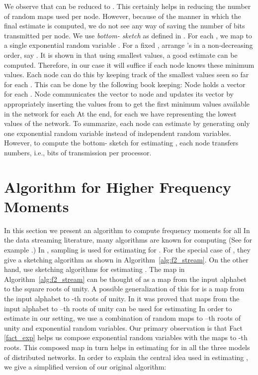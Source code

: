 \documentclass[10pt,twosided,a4paper,draft,onecolumn]{article}
\begin{document}
We observe that  can be reduced to . This certainly helps in
reducing the number of random maps used per node. However, because of
the manner in which the final estimate is computed, we do not see any
way of saving the number of bits transmitted per node. We use
\emph{bottom- sketch} as defined in \cite{Cohen07}. For each , we map  to a single exponential random
variable . For a fixed , arrange 's in a
non-decreasing order, say . It is shown in \cite{Cohen07} that using  smallest
values, a good estimate can be computed.  Therefore, in our case it
will suffice if each node knows these  minimum values.  Each node
can do this by keeping track of the  smallest values seen so far
for each . This can be done by the following book keeping: Node 
holds a vector  for each
. Node  communicates the vector  to node
 and updates its vector by appropriately inserting the values from
 to get the first  minimum values available in the network
for each  At the end, for each  we have  representing the  lowest values of the
network. To summarize, each node can estimate  by generating
only one exponential random variable instead of  independent
random variables. However, to compute the bottom- sketch for
estimating , each node transfers  numbers, i.e.,
 bits of transmission per processor.

\section{Algorithm for Higher Frequency Moments}
\label{sec:Fk}

In this section we present an algorithm to compute frequency moments
 for all  In the data streaming literature, many
algorithms are known for computing  (See for example
\cite{Alon96,Coppersmith04,Ganguly04}.) In \cite{Alon96}, sampling is
used for estimating  for . For the special case of
, they give a sketching algorithm as shown in
Algorithm~\ref{alg:f2_stream}. On the other hand,
\cite{Coppersmith04,Ganguly04} use sketching algorithms for estimating
. The map  in Algorithm~\ref{alg:f2_stream} can be thought
of as a map from the input alphabet to the square roots of unity. A
possible generalization of this for  is a map from the input
alphabet to -th roots of unity. In \cite{Ganguly04} it was proved
that maps from the input alphabet to --th roots of unity can be
used for estimating  In order to estimate  in our setting,
we use a combination of random maps to --th roots of unity and
exponential random variables. Our primary observation is that Fact
\ref{fact_exp} helps us compose exponential random variables with the
maps to -th roots. This composed map in turn helps in estimating
 for  in all the three models of distributed networks.
In order to explain the central idea used in estimating  , we give a simplified version of our original algorithm:
\end{document}
